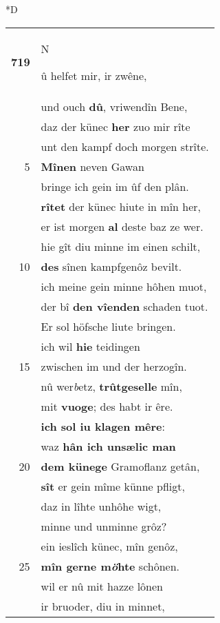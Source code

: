 \documentclass[8pt,a4paper,notitlepage]{article}
\begin{document}
\begin{table}[ht]
\begin{minipage}[t]{0.5\linewidth}
\small
\begin{center}*D
\end{center}
\begin{tabular}{rl}
\textbf{719} & \begin{large}N\end{large}û helfet mir, ir zwêne,\\ 
 & und ouch \textbf{dû}, vriwendîn Bene,\\ 
 & daz der künec \textbf{her} zuo mir rîte\\ 
 & unt den kampf doch morgen strîte.\\ 
5 & \textbf{Mînen} neven Gawan\\ 
 & bringe ich gein im ûf den plân.\\ 
 & \textbf{rîtet} der künec hiute in mîn her,\\ 
 & er ist morgen \textbf{al} deste baz ze wer.\\ 
 & hie gît diu minne im einen schilt,\\ 
10 & \textbf{des} sînen kampfgenôz bevilt.\\ 
 & ich meine gein minne hôhen muot,\\ 
 & der bî \textbf{den vîenden} schaden tuot.\\ 
 & Er sol höfsche liute bringen.\\ 
 & ich wil \textbf{hie} teidingen\\ 
15 & zwischen im und der herzogîn.\\ 
 & nû wer\textit{b}etz, \textbf{trûtgeselle} mîn,\\ 
 & mit \textbf{vuoge}; des habt ir êre.\\ 
 & \textbf{ich sol iu klagen mêre}:\\ 
 & waz \textbf{hân ich unsælic man}\\ 
20 & \textbf{dem künege} Gramoflanz getân,\\ 
 & \textbf{sît} er gein mîme künne pfligt,\\ 
 & daz in lîhte unhôhe wigt,\\ 
 & minne und unminne grôz?\\ 
 & ein ieslîch künec, mîn genôz,\\ 
25 & \textbf{mîn gerne m\textit{ö}hte} schônen.\\ 
 & wil er nû mit hazze lônen\\ 
 & ir bruoder, diu in minnet,\\ 

\end{tabular}
\end{minipage}
\end{table}
\end{document}

